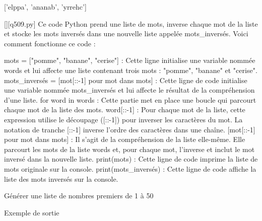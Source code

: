 ['elppa', 'ananab', 'yrrehc']
        \par
        \begin{solution}
            \renewcommand{\nomfichier}{q509.py}
            \pythonfile{\chemincode \nomfichier}[][\nomfichier]
            Ce code Python prend une liste de mots, inverse chaque mot de la liste et stocke les mots inversés dans une nouvelle liste appelée mots\_inversés. Voici comment fonctionne ce code :

    mots = ["pomme", "banane", "cerise"] : Cette ligne initialise une variable nommée words et lui affecte une liste contenant trois mots : "pomme", "banane" et "cerise".
    mots\_inversés = [mot[::-1] pour mot dans mots] : Cette ligne de code initialise une variable nommée mots\_inversés et lui affecte le résultat de la compréhension d'une liste.
        for word in words : Cette partie met en place une boucle qui parcourt chaque mot de la liste des mots.
        word[::-1] : Pour chaque mot de la liste, cette expression utilise le découpage ([::-1]) pour inverser les caractères du mot. La notation de tranche [::-1] inverse l'ordre des caractères dans une chaîne.
        [mot[::-1] pour mot dans mots] : Il s'agit de la compréhension de la liste elle-même. Elle parcourt les mots de la liste words et, pour chaque mot, l'inverse et inclut le mot inversé dans la nouvelle liste.
    print(mots) : Cette ligne de code imprime la liste de mots originale sur la console.
    print(mots\_inversés) : Cette ligne de code affiche la liste des mots inversés sur la console.
        \end{solution}
        

        \question
        Générer une liste de nombres premiers de 1 à 50

Exemple de sortie


